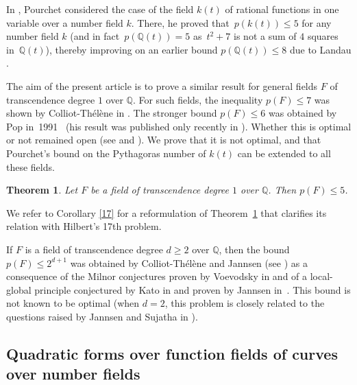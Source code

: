 \documentclass{amsart}
\newtheorem{thm}{Theorem}[section]
\theoremstyle{definition}
\theoremstyle{remark}
\numberwithin{equation}{section}
\def\Q{\mathbb Q}
\begin{document}
In \cite{Pourchet}, Pourchet considered the case of the field $k(t)$ of rational functions in one variable over a number field $k$. There, he proved that~$p(k(t))\leq 5$ for any number field $k$ (and in fact~$p(\Q(t))=5$ as~$t^2+7$ is not a sum of $4$ squares in~$\Q(t)$), thereby improving on an earlier bound $p(\Q(t))\leq 8$ due to Landau \cite{Landau}. 

\vspace{1em}

The aim of the present article is to prove a similar result for general fields $F$ of transcendence degree $1$ over $\Q$. For such fields, the inequality $p(F)\leq 7$ was shown by Colliot-Th\'el\`ene in \cite{CTAppendix}. The stronger bound $p(F)\leq 6$ was obtained by Pop in~1991~\cite{Popnote} (his result was published only recently in \cite{Pop}). Whether this is optimal or not remained open (see \cite[Chap.\,7 Conjecture~1.10\,(1)]{Pfisterbook} and \mbox{\cite[\S 3]{Pop}}). We prove that it is not optimal, and that Pourchet's bound on the Pythagoras number of $k(t)$ can be extended to all these fields.

\begin{thm}
\label{main1}
Let $F$ be a field of transcendence degree $1$ over $\Q$. Then $p(F)\leq 5$.
\end{thm}

We refer to Corollary \ref{17} for a reformulation of Theorem~\ref{main1} that clarifies its relation with Hilbert's 17th problem.

If $F$ is a field of transcendence degree $d\geq 2$ over $\Q$, then the bound ${p(F)\leq 2^{d+1}}$ was obtained by Colliot-Th\'el\`ene and Jannsen (see \cite{CTAppendix,CTJ, Jannsen}) as a consequence of the Milnor conjectures proven by Voevodsky in \cite{Voevodsky} and of a local-global principle conjectured by Kato in \cite{Kato} and proven by Jannsen in~\cite{Jannsen}. This bound is not known to be optimal (when $d=2$, this problem is closely related to the questions raised by Jannsen and Sujatha in \cite[Remarks~8]{JS}).


\subsection{Quadratic forms over function fields of curves over number fields}
\label{parth2}
\end{document}
